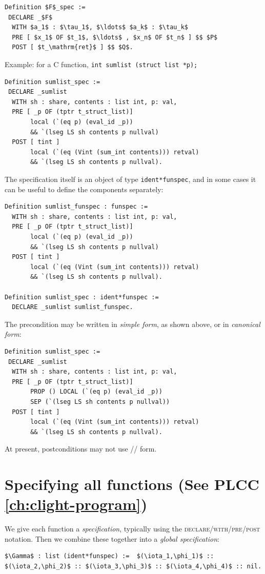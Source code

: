 \documentclass[12pt,fleqn,openany,oneside,showtrims]{memoir}
\newcommand{\ychapter}[2]{\chapter[#1]{#1 \hfill \normalsize #2}}
\begin{document}
\begin{lstlisting}
Definition $F$_spec :=
 DECLARE _$F$
  WITH $a_1$ : $\tau_1$, $\ldots$ $a_k$ : $\tau_k$
  PRE [ $x_1$ OF $t_1$, $\ldots$ , $x_n$ OF $t_n$ ] $$ $P$
  POST [ $t_\mathrm{ret}$ ] $$ $Q$.
\end{lstlisting}

Example: for a C function, \lstinline{int sumlist (struct list *p);}

\begin{lstlisting}
Definition sumlist_spec :=
 DECLARE _sumlist
  WITH sh : share, contents : list int, p: val,
  PRE [ _p OF (tptr t_struct_list)]  
       local (`(eq p) (eval_id _p))
       && `(lseg LS sh contents p nullval)
  POST [ tint ]  
       local (`(eq (Vint (sum_int contents))) retval)
       && `(lseg LS sh contents p nullval).
\end{lstlisting}

The specification itself is an object of type \lstinline{ident*funspec},
and in some cases it can be useful to define the components
separately:

\begin{lstlisting}
Definition sumlist_funspec : funspec :=
  WITH sh : share, contents : list int, p: val,
  PRE [ _p OF (tptr t_struct_list)]  
       local (`(eq p) (eval_id _p))
       && `(lseg LS sh contents p nullval)
  POST [ tint ]  
       local (`(eq (Vint (sum_int contents))) retval)
       && `(lseg LS sh contents p nullval).

Definition sumlist_spec : ident*funspec :=
  DECLARE _sumlist sumlist_funspec.
\end{lstlisting}

The precondition may be written in 
\emph{simple form}, as shown above, or in \emph{canonical form}:

\begin{lstlisting}
Definition sumlist_spec :=
 DECLARE _sumlist
  WITH sh : share, contents : list int, p: val,
  PRE [ _p OF (tptr t_struct_list)]  
       PROP () LOCAL (`(eq p) (eval_id _p)) 
       SEP (`(lseg LS sh contents p nullval))
  POST [ tint ]  
       local (`(eq (Vint (sum_int contents))) retval)
       && `(lseg LS sh contents p nullval).
\end{lstlisting}

At present, postconditions may not use \PROP/\LOCAL/\SEP{} form.

\ychapter{Specifying all functions}{(See PLCC \autoref{ch:clight-program})}

We give each function a \emph{specification},
typically using the \textsc{declare/\linebreak[1]with/\linebreak[1]pre/\linebreak[1]post} notation.
Then we combine these together into a \emph{global specification}:
\begin{lstlisting}
$\Gamma$ : list (ident*funspec) :=  $(\iota_1,\phi_1)$ :: $(\iota_2,\phi_2)$ :: $(\iota_3,\phi_3)$ :: $(\iota_4,\phi_4)$ :: nil.
\end{lstlisting}
\end{document}
